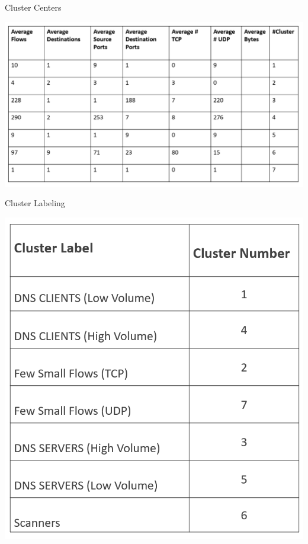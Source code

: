 \begin{table}[b]
	\caption{Cluster Centers}%
	\centerline{\includegraphics[scale = 0.6]{cluster_centers.png}}
	
\end{table}

\begin{table}[b]
		\caption{Cluster Labeling}%
	\centerline{\includegraphics[scale = 0.6]{cluster_label.png}}

\end{table}

